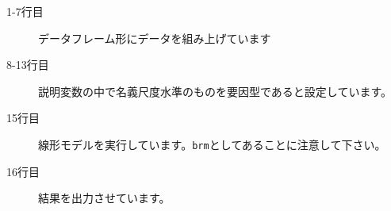 \begin{description}
	\item[1-7行目] データフレーム形にデータを組み上げています
	\item[8-13行目] 説明変数の中で名義尺度水準のものを要因型であると設定しています。
	\item[15行目] 線形モデルを実行しています。\texttt{brm}としてあることに注意して下さい。
	\item[16行目] 結果を出力させています。
\end{description}
